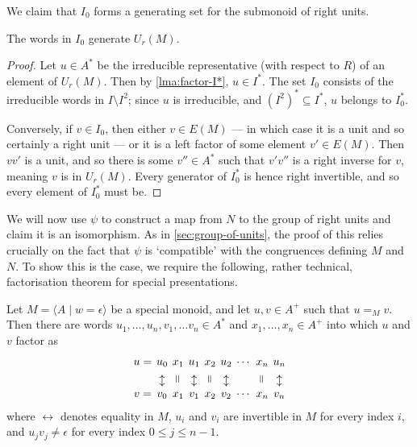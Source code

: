 \documentclass[noindex,noinsetproof,12pt]{lmaths}
\begin{document}
We claim that $I_0$ forms a generating set for the submonoid of right units.

\begin{lemma} \label{lma:I0*-generates-Ur}
	The words in $I_0$ generate $U_r(M)$.
\end{lemma}
\begin{proof}
	Let $u \in A^*$ be the irreducible representative (with respect to $R$) of an element of $U_r(M)$. Then by \cref{lma:factor-I*}, $u \in I^*$. The set $I_0$ consists of the irreducible words in $I \setminus I^2$; since $u$ is irreducible, and $(I^2)^* \subseteq I^*$, $u$ belongs to $I_0^*$.

	Conversely, if $v \in I_0$, then either $v \in E(M)$ --- in which case it is a unit and so certainly a right unit --- or it is a left factor of some element $v' \in E(M)$. Then $vv'$ is a unit, and so there is some $v'' \in A^*$ such that $v'v''$ is a right inverse for $v$, meaning $v$ is in $U_r(M)$. Every generator of $I_0^*$ is hence right invertible, and so every element of $I_0^*$ must be.
\end{proof}

We will now use $\psi$ to construct a map from $N$ to the group of right units and claim it is an isomorphism. As in \cref{sec:group-of-units}, the proof of this relies crucially on the fact that $\psi$ is `compatible' with the congruences defining $M$ and $N$. To show this is the case, we require the following, rather technical, factorisation theorem for special presentations.

\newcommand{\verteq}{\rotatebox{90}{$=$\hspace{0.5em}}}
\newcommand{\verteqM}{\updownarrow}
\begin{lemma} \label{lma:special-factorisation}
	Let $M = \langle A \mid w = \epsilon\rangle$ be a special monoid,  and let $u, v \in A^+$ such that $u =_M v$. Then there are words $u_1, \ldots, u_n, v_1, \ldots v_n \in A^*$ and $x_1, \ldots, x_n \in A^+$ into which $u$ and $v$ factor as
		\[
		\arraycolsep=0.2em
		\begin{array}{ccccccccc}
			u =& u_0 & x_1 & u_1 & x_2 & u_2 & \cdots & x_n & u_n \\
			& \verteqM & \verteq & \verteqM & \verteq & \verteqM & & \verteq & \verteqM \\
			v =& v_0 & x_1 & v_1 & x_2 & v_2 & \cdots & x_n & v_n
		\end{array}
		\]
	where $\leftrightarrow$ denotes equality in $M$, $u_i$ and $v_i$ are invertible in $M$ for every index $i$, and $u_j v_j \ne \epsilon$ for every index $0 \le j \le n - 1$.
\end{lemma}
\end{document}
